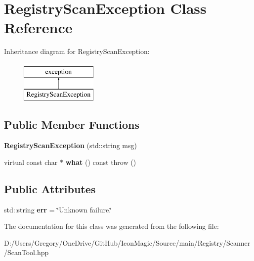 \hypertarget{class_registry_scan_exception}{}\section{Registry\+Scan\+Exception Class Reference}
\label{class_registry_scan_exception}
Inheritance diagram for Registry\+Scan\+Exception\+:\begin{figure}[H]
\begin{center}
\leavevmode
\includegraphics[height=2.000000cm]{class_registry_scan_exception}
\end{center}
\end{figure}
\subsection*{Public Member Functions}
\begin{DoxyCompactItemize}
\item 
\hypertarget{class_registry_scan_exception_a3fc3e488fa2ba4d314b4b925d4ecb623}{}{\bfseries Registry\+Scan\+Exception} (std\+::string msg)\label{class_registry_scan_exception_a3fc3e488fa2ba4d314b4b925d4ecb623}

\item 
\hypertarget{class_registry_scan_exception_afcc2a8528d6f0d8df61e716b4f166860}{}virtual const char $\ast$ {\bfseries what} () const   throw ()\label{class_registry_scan_exception_afcc2a8528d6f0d8df61e716b4f166860}

\end{DoxyCompactItemize}
\subsection*{Public Attributes}
\begin{DoxyCompactItemize}
\item 
\hypertarget{class_registry_scan_exception_a7aa8ae7d91676c28175bbe39f97c9515}{}std\+::string {\bfseries err} = \char`\"{}Unknown failure.\char`\"{}\label{class_registry_scan_exception_a7aa8ae7d91676c28175bbe39f97c9515}

\end{DoxyCompactItemize}


The documentation for this class was generated from the following file\+:\begin{DoxyCompactItemize}
\item 
D\+:/\+Users/\+Gregory/\+One\+Drive/\+Git\+Hub/\+Icon\+Magic/\+Source/main/\+Registry/\+Scanner/Scan\+Tool.\+hpp\end{DoxyCompactItemize}
